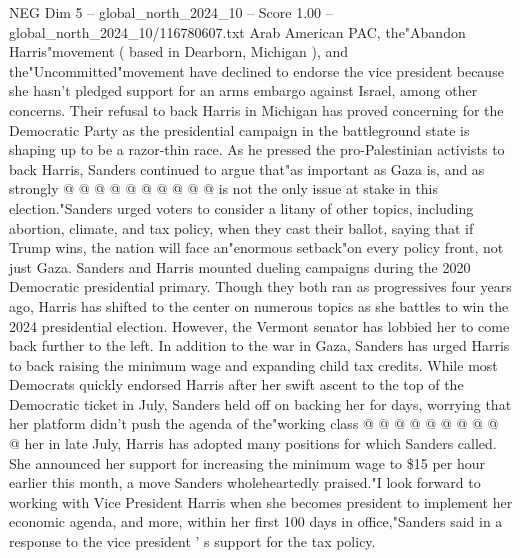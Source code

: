 \begin{textsample}{NEG Dim 5 – global\_north\_2024\_10 – Score 1.00 – global\_north\_2024\_10/116780607.txt}
Arab American PAC, the"Abandon Harris"movement ( based in Dearborn, Michigan ), and the"Uncommitted"movement have declined to endorse the vice president because she hasn't pledged support for an arms embargo against Israel, among other concerns.
Their refusal to back Harris in Michigan has proved concerning for the Democratic Party as the presidential campaign in the battleground state is shaping up to be a razor-thin race.
As he pressed the pro-Palestinian activists to back Harris, Sanders continued to argue that"as important as Gaza is, and as strongly @ @ @ @ @ @ @ @ @ @ is not the only issue at stake in this election."Sanders urged voters to consider a litany of other topics, including abortion, climate, and tax policy, when they cast their ballot, saying that if Trump wins, the nation will face an"enormous setback"on every policy front, not just Gaza.
Sanders and Harris mounted dueling campaigns during the 2020 Democratic presidential primary.
Though they both ran as progressives four years ago, Harris has shifted to the center on numerous topics as she battles to win the 2024 presidential election.
However, the Vermont senator has lobbied her to come back further to the left.
In addition to the war in Gaza, Sanders has urged Harris to back raising the minimum wage and expanding child tax credits.
While most Democrats quickly endorsed Harris after her swift ascent to the top of the Democratic ticket in July, Sanders held off on backing her for days, worrying that her platform didn't push the agenda of the"working class @ @ @ @ @ @ @ @ @ @ her in late July, Harris has adopted many positions for which Sanders called.
She announced her support for increasing the minimum wage to \$15 per hour earlier this month, a move Sanders wholeheartedly praised."I look forward to working with Vice President Harris when she becomes president to implement her economic agenda, and more, within her first 100 days in office,"Sanders said in a response to the vice president ' s support for the tax policy.

\end{textsample}
